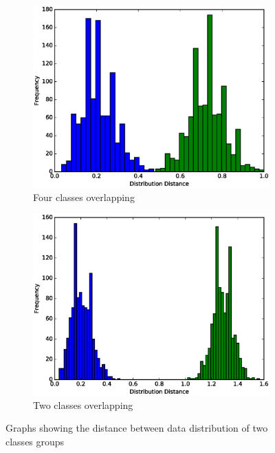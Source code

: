 \documentclass[pageno]{jpaper}
\begin{document}
\begin{figure}
\centering
\begin{subfigure}{.5\textwidth}
  \centering
  \includegraphics[scale=0.4]{profiler1.ps}
  \caption{Four classes overlapping}
  \label{fig:distributionDistance1}
\end{subfigure}%
\begin{subfigure}{.5\textwidth}
  \centering
  \includegraphics[scale=0.4]{profiler2.ps}
  \caption{Two classes overlapping}
  \label{fig:distributionDistance2}
\end{subfigure}

\caption{Graphs showing the distance between data distribution of two classes groups}
\label{fig:distributionDistance}
\end{figure}
\end{document}
